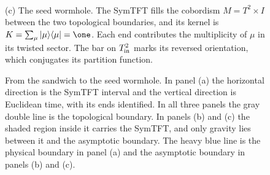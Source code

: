 \documentclass[11pt]{article}
\numberwithin{equation}{section}
\begin{document}
\begin{figure}[t]
\begin{minipage}{0.9\textwidth}
    \centering
    \\[2pt]
    \footnotesize (c) The seed wormhole. The SymTFT fills the cobordism $M = T^2 \times I$ between the two
    topological boundaries, and its kernel is $K = \sum_\mu |\mu\rangle\langle\mu| = \one$.
    Each end contributes the multiplicity of $\mu$ in its twisted sector. The bar on $T^2_{\rm in}$
    marks its reversed orientation, which conjugates its
    partition function.
  \end{minipage}
  \caption{From the sandwich to the seed wormhole. In panel (a) the horizontal direction is the
  SymTFT interval and the vertical direction is Euclidean time, with its ends identified. In all three
  panels the gray double line is the topological boundary. In panels (b) and (c) the shaded region
  inside it carries the SymTFT, and only gravity lies between it and the asymptotic boundary. The heavy
  blue line is the physical boundary in panel (a) and the asymptotic boundary in panels (b) and (c).}
  \label{fig:sandwich}
\end{figure}
\end{document}
